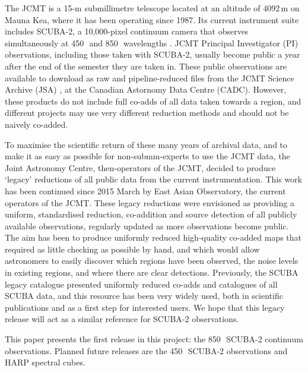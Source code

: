 \documentclass[twocolumn,times]{aastex6}
\newcommand{\um}{\micron}
\begin{document}
The JCMT is a 15-m submillimetre telescope located at an altitude of
4092\,m on Mauna Kea, where it has been operating since 1987. Its
current instrument suite includes SCUBA-2, a 10,000-pixel continuum
camera that observes simultaneously at 450\,\um\ and 850\,\um\
wavelengths \citep{Holland2013}.  JCMT Principal Investigator (PI)
observations, including
those taken with SCUBA-2, usually become public a year after the end
of the semester they are taken in. These public observations are
available to download as raw and pipeline-reduced files from the
JCMT Science Archive (JSA) \citep{2015Economou}, at the Canadian
Astornomy Data Centre (CADC). However, these products do not include
full co-adds of all data taken towards a region, and different projects
may use very different reduction methods and should not be
naively co-added.

To maximise the scientific return of these many years of archival
data, and to make it as easy as possible for non-submm-experts to use
the JCMT data, the Joint Astronomy Centre, then-operators of the JCMT,
decided to produce `legacy' reductions of all public data from the
current instrumentation. This work has been continued since 2015 March
by East Asian Observatory, the current operators of the JCMT. These
legacy reductions were envisioned as providing a uniform, standardised
reduction, co-addition and source detection of all publicly available
observations, regularly updated as more observations become
public. The aim has been to produce uniformly reduced high-quality
co-added maps that required as little checking as possible by hand,
and which would allow astronomers to easily discover which regions
have been observed, the noise levels in existing regions, and where
there are clear detections. Previously, the SCUBA legacy catalogue
\citep{DiFrancesco2008} presented uniformly reduced co-adds and
catalogues of all SCUBA data, and this resource has been very widely
used, both in scientific publications and as a first step for
interested users. We hope that this legacy release will act as a similar
reference for SCUBA-2 observations.

This paper presents the first release in this project: the 850\,\um\
SCUBA-2 continuum observations. Planned future releases are the
450\,\um\ SCUBA-2 observations and HARP spectral cubes.


\end{document}
